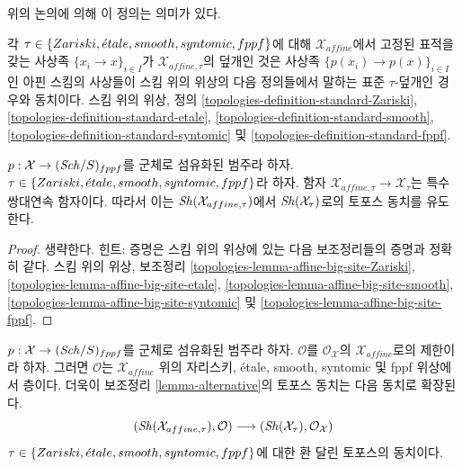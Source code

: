 \noindent
위의 논의에 의해 이 정의는 의미가 있다.\par\noindent
각 $\tau \in \{Zariski, {\acute{e}tale}, smooth, syntomic, fppf\}$에 대해
$\mathcal{X}_{affine}$에서 고정된 표적을 갖는 사상족
$\{x_i \to x\}_{i \in I}$가 $\mathcal{X}_{affine, \tau}$의 덮개인 것은
사상족 $\{p(x_i) \to p(x)\}_{i \in I}$인 아핀 스킴의 사상들이
스킴 위의 위상의 다음 정의들에서 말하는 표준 $\tau$-덮개인 경우와 동치이다.
스킴 위의 위상, 정의
\ref{topologies-definition-standard-Zariski},
\ref{topologies-definition-standard-etale},
\ref{topologies-definition-standard-smooth},
\ref{topologies-definition-standard-syntomic} 및
\ref{topologies-definition-standard-fppf}.

\begin{lemma}
\label{lemma-alternative}
 $p : \mathcal{X} \to (\mathit{Sch}/S)_{fppf}$를 군체로 섬유화된 범주라 하자.
$\tau \in \{Zariski, {\acute{e}tale}, smooth, syntomic, fppf\}$라 하자. 함자
$\mathcal{X}_{affine, \tau} \to \mathcal{X}_\tau$는 특수 쌍대연속 함자이다.
따라서 이는 $\mathop{\mathit{Sh}}\nolimits(\mathcal{X}_{affine, \tau})$에서
$\mathop{\mathit{Sh}}\nolimits(\mathcal{X}_\tau)$로의 토포스 동치를 유도한다.
\end{lemma}

\begin{proof}
생략한다. 힌트: 증명은 스킴 위의 위상에 있는 다음 보조정리들의 증명과 정확히 같다.
스킴 위의 위상, 보조정리
\ref{topologies-lemma-affine-big-site-Zariski},
\ref{topologies-lemma-affine-big-site-etale},
\ref{topologies-lemma-affine-big-site-smooth},
\ref{topologies-lemma-affine-big-site-syntomic} 및
\ref{topologies-lemma-affine-big-site-fppf}.
\end{proof}

\noindent
 $p : \mathcal{X} \to (\mathit{Sch}/S)_{fppf}$를 군체로 섬유화된 범주라 하자.
$\mathcal{O}$를 $\mathcal{O}_\mathcal{X}$의 $\mathcal{X}_{affine}$로의
제한이라 하자. 그러면 $\mathcal{O}$는 $\mathcal{X}_{affine}$ 위의
자리스키, \'etale, smooth, syntomic 및 fppf 위상에서 층이다. 더욱이
보조정리 \ref{lemma-alternative}의 토포스 동치는 다음 동치로 확장된다.
\begin{equation}
\label{equation-alternative-ringed}
(\mathop{\mathit{Sh}}\nolimits(\mathcal{X}_{affine, \tau}), \mathcal{O})
\longrightarrow
(\mathop{\mathit{Sh}}\nolimits(\mathcal{X}_\tau), \mathcal{O}_\mathcal{X})
\end{equation}
$\tau \in \{Zariski, {\acute{e}tale}, smooth, syntomic, fppf\}$에 대한 환 달린 토포스의 동치이다.









